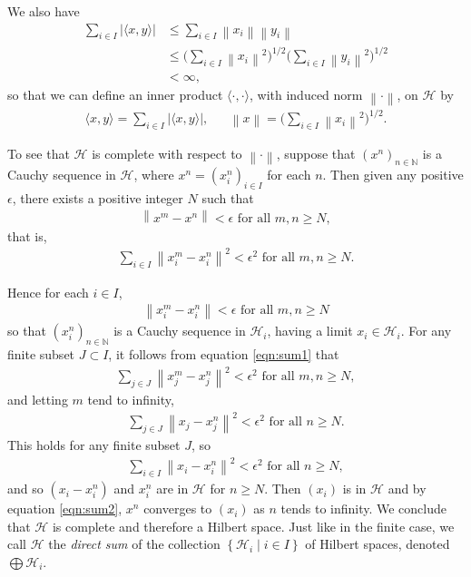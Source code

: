 \documentclass[11pt,a4paper]{report}
\theoremstyle{plain}
\theoremstyle{definition}
\newcommand{\1}{\mathbbm{1}}
\newcommand{\N}{\mathbb{N}}
\renewcommand{\H}{\mathcal{H}}
\renewcommand{\oplus}{\textstyle\bigoplus}
\begin{document}
We also have
\begin{align*}
			\sum_{i\in I}{\left|\langle x,y\rangle\right|} 
	&\leq	\sum_{i\in I}{\left\|x_i\right\|	\left\|y_i\right\|}						\\
	&\leq 	\Big(\sum_{i\in I}{\left\|x_i\right\|^2}\Big)^{1/2}
							\Big(\sum_{i\in I}{\left\|y_i\right\|^2}\Big)^{1/2}			\\
	&< \infty,
\end{align*}
so that we can define an inner product $\langle\cdot,\cdot\rangle$, with induced 
norm $\left\|\cdot\right\|$, on $\H$ by
\begin{align*}
	\langle x,y\rangle = \sum_{i\in I}{\left|\langle x,y\rangle\right|}, 
			&& \left\|x\right\| = \Big(\sum_{i\in I}{\left\|x_i\right\|^2}\Big)^{1/2}.
\end{align*}

To see that $\H$ is complete with respect to $\left\|\cdot\right\|$, suppose 
that $(x^{n})_{n\in\N}$ is a Cauchy sequence in $\H$, where $x^{n} = 
(x^n_i)_{i\in I}$ for each $n$. Then given any positive $\epsilon$, there exists 
a positive integer $N$ such that
\begin{align*}
	\left\|x^m-x^n\right\| < \epsilon \mbox{ for all } m,n\geq N,
\end{align*}
that is,
\begin{align}\label{eqn:sum1}
	\sum_{i\in I}{\left\|x^m_i-x^n_i\right\|^2} < \epsilon^2 \mbox{ for all } m,n\geq N.
\end{align}

Hence for each $i\in I$,
\begin{align*}
	\left\|x^m_i-x^n_i\right\| < \epsilon \mbox{ for all } m,n\geq N
\end{align*}
so that $(x^n_i)_{n\in\N}$ is a Cauchy sequence in $\H_i$, having a limit $x_i\in\H_i$.
For any finite subset $J\subset I$, it follows from equation \eqref{eqn:sum1} that 
\begin{align*}
	\sum_{j\in J}{\left\|x^m_j-x^n_j\right\|^2} < \epsilon^2  \mbox{ for all } m,n\geq N,
\end{align*}
and letting $m$ tend to infinity,
\begin{align}\label{eqn:sum2}
	\sum_{j\in J}{\left\|x_j-x^n_j\right\|^2} < \epsilon^2  \mbox{ for all } n\geq N.
\end{align}
This holds for any finite subset $J$, so
\begin{align*}
	\sum_{i\in I}{\left\|x_i-x^n_i\right\|^2} < \epsilon^2  \mbox{ for all } n\geq N,
\end{align*}
and so $(x_i-x^n_i)$ and $x^n_i$ are in $\H$ for $n\geq N$. Then $(x_i)$ is in 
$\H$ and by equation \eqref{eqn:sum2}, $x^n$ converges to $(x_i)$ as $n$ tends to 
infinity. We conclude that $\H$ is complete and therefore a Hilbert space. Just 
like in the finite case, we call $\H$ the \emph{direct sum} of the collection 
$\left\{\H_i \mid i\in I\right\}$ of Hilbert spaces, denoted $\oplus\H_i$.
\end{document}
